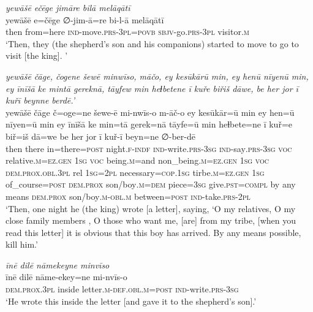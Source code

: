 \ea \label{KŠ.53}
\textit{yewāšē ečēge jimāre bilā melāqātī} \\ 
\gll yewāšē e=čēge ∅-jim-ā=re bi-l-ā melāqātī \\ 
 then from=here \textsc{ind-}move\textsc{.prs}\textsc{-3pl}\textsc{=\textsc{povb}} \textsc{sbjv-}go\textsc{.prs}\textsc{-3pl} visitor\textsc{.m} \\ 
\glt `Then, they (the shepherd's son and his companions) started to move to go to visit [the king]. '
\z 
 
\ea \label{KŠ.56}
\textit{yewāšē čāge, čogene šewē minwīso, māčo, ey kesūkārū min, ey henū nīyenū min, ey īnīšā ke mintā gereknā, tāyfew min heɫbetene ī kuře biřiš dāwe, be her jor ī kuřī beynne berdē.’} \\ 
\gll yewāšē čāge č=oge=ne šewe-ē mi-nwīs-o m-āč-o ey kesūkār=ū min ey hen=ū nīyen=ū min ey īnīšā ke min=tā gerek=nā tāyfe=ū min heɫbete=ne ī kuř=e biř=iš dā=we be her jor ī kuř-ī beyn=ne ∅-ber-dē \\ 
 then there in=there\textsc{=\textsc{post}} night\textsc{.f}\textsc{-indf} \textsc{ind-}write\textsc{.prs}\textsc{-3sg} \textsc{ind-}say\textsc{.prs}\textsc{-3sg} \textsc{voc} relative\textsc{.m}\textsc{\textsc{=ez.gen}} \textsc{1sg} \textsc{voc} being\textsc{.m}=and non\_being\textsc{.m}\textsc{\textsc{=ez.gen}} \textsc{1sg} \textsc{voc} \textsc{dem.prox}\textsc{.obl}\textsc{.3pl} rel \textsc{1sg}=\textsc{2pl} necessary\textsc{=cop}\textsc{.\textsc{1sg}} tirbe\textsc{.m}\textsc{\textsc{=ez.gen}} \textsc{1sg} of\_course\textsc{=\textsc{post}} \textsc{dem.prox} son/boy\textsc{.m}\textsc{=dem} piece\textsc{=3sg} give\textsc{.pst}\textsc{=compl} by any means \textsc{dem.prox} son/boy\textsc{.m}\textsc{-obl}\textsc{.m} between\textsc{=\textsc{post}} \textsc{ind-}take\textsc{.prs}-\textsc{2pl} \\ 
\glt `Then, one night he (the king) wrote [a letter], saying, ‘O my relatives, O my close family members , O those who want me, [are] from my tribe, [when you read this letter] it is obvious that this boy has arrived. By any means possible, kill him.'
\z 
 
\ea \label{KŠ.57}
\textit{īnē dilē nāmekeyne minvīso} \\ 
\gll īnē dilē nāme-ekey=ne mi-nvīs-o \\ 
 \textsc{dem.prox}\textsc{.3pl} inside letter\textsc{.m}\textsc{-def}\textsc{.obl}\textsc{.m}\textsc{=\textsc{post}} \textsc{ind-}write\textsc{.prs}\textsc{-3sg} \\ 
\glt `He wrote this inside the letter [and gave it to the shepherd’s son].'
\z 
 
